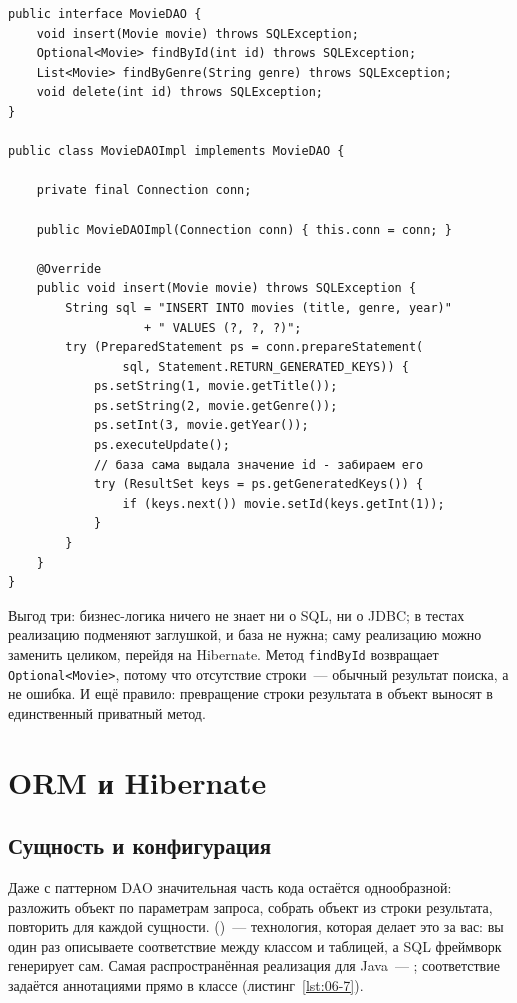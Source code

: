 \begin{listing}[H]
\begin{verbatim}
public interface MovieDAO {
    void insert(Movie movie) throws SQLException;
    Optional<Movie> findById(int id) throws SQLException;
    List<Movie> findByGenre(String genre) throws SQLException;
    void delete(int id) throws SQLException;
}

public class MovieDAOImpl implements MovieDAO {

    private final Connection conn;

    public MovieDAOImpl(Connection conn) { this.conn = conn; }

    @Override
    public void insert(Movie movie) throws SQLException {
        String sql = "INSERT INTO movies (title, genre, year)"
                   + " VALUES (?, ?, ?)";
        try (PreparedStatement ps = conn.prepareStatement(
                sql, Statement.RETURN_GENERATED_KEYS)) {
            ps.setString(1, movie.getTitle());
            ps.setString(2, movie.getGenre());
            ps.setInt(3, movie.getYear());
            ps.executeUpdate();
            // база сама выдала значение id - забираем его
            try (ResultSet keys = ps.getGeneratedKeys()) {
                if (keys.next()) movie.setId(keys.getInt(1));
            }
        }
    }
}
\end{verbatim}
\caption{Интерфейс DAO и фрагмент его реализации}
\label{lst:06-6}
\end{listing}

Выгод три: бизнес-логика ничего не знает ни о SQL, ни о JDBC; в тестах
реализацию подменяют заглушкой, и база не нужна; саму реализацию можно
заменить целиком, перейдя на Hibernate. Метод \texttt{findById} возвращает
\texttt{Optional<Movie>}, потому что отсутствие строки~--- обычный результат
поиска, а не ошибка. И ещё правило: превращение строки результата в объект
выносят в единственный приватный метод.

\section{ORM и Hibernate}

\subsection{Сущность и конфигурация}

Даже с паттерном DAO значительная часть кода остаётся однообразной: разложить
объект по параметрам запроса, собрать объект из строки результата, повторить
для каждой сущности.  ()~---
технология, которая делает это за вас: вы один раз описываете соответствие
между классом и таблицей, а SQL фреймворк генерирует сам. Самая
распространённая реализация для Java~--- ; соответствие
задаётся аннотациями прямо в классе (листинг~\ref{lst:06-7}).

